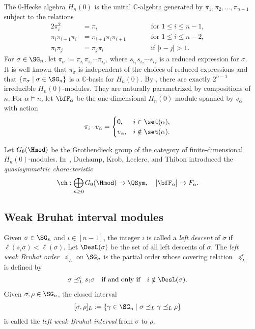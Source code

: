 \documentclass[12pt, reqno]{amsart}
\numberwithin{equation}{section}
\numberwithin{figure}{section}
\numberwithin{table}{section}
\theoremstyle{definition}
\def\C{\mathbb C}
\begin{document}
The $0$-Hecke algebra $H_n(0)$ is the unital $\C$-algebra generated by $\pi_1,\pi_2,\ldots,\pi_{n-1}$ subject to the relations
\begin{alignat}{2}\label{eq: relations of pi}
\pi_i^2 &= \pi_i 
&\qquad& \text{for } 1\le i \le n-1, \nonumber \\ 
\pi_i\pi_{i+1}\pi_i &= \pi_{i+1}\pi_i\pi_{i+1}
&\qquad& \text{for } 1\le i \le n-2, \\ \nonumber
\pi_i\pi_j &= \pi_j\pi_i
&\qquad& \text{if } |i-j|>1.
\end{alignat}
For $\sigma \in \SG_n$, let $\pi_\sigma:=\pi_{i_1}\pi_{i_2}\cdots\pi_{i_k}$, where $s_{i_1}s_{i_2}\cdots s_{i_k}$ is a reduced expression for $\sigma$.
It is well known that $\pi_\sigma$ is independent of the choices of reduced expressions and that $\{\pi_\sigma \mid \sigma \in \SG_n\}$ is a $\C$-basis for $H_n(0)$.
By \cite{Norton79}, there are exactly $2^{n-1}$ irreducible $H_n(0)$-modules. They are naturally parametrized by compositions of $n$.
For $\alpha\models n$, let $\bfF_\alpha$ be the one-dimensional $H_n(0)$-module spanned by $v_\alpha$ with action
\[
\pi_i\cdot v_\alpha=
\begin{cases}
0, & i\in \set(\alpha),\\
v_\alpha, & i\notin \set(\alpha).
\end{cases}
\]

Let $G_0(\Hmod)$ be the Grothendieck group of the category of finite-dimensional $H_n(0)$-modules. In~\cite{DKLT96}, Duchamp, Krob, Leclerc, and Thibon introduced the \emph{quasisymmetric characteristic}
\[
\ch:\bigoplus_{n\ge 0}G_0(\Hmod) \rightarrow \QSym,
\quad
[\bfF_\alpha]\mapsto F_\alpha.
\]




\subsection{Weak Bruhat interval modules}
\label{subsec: weak bruhat prelim}


Given $\sigma \in \SG_n$ and $i \in [n-1]$, the integer $i$ is called a \emph{left descent} of $\sigma$ if $\ell(s_i\sigma)<\ell(\sigma)$.
Let $\DesL(\sigma)$ be the set of all left descents of $\sigma$.
The \emph{left weak Bruhat order} $\preceq_L$ on $\SG_n$ is the partial order whose covering relation $\preceq_L^c$ is defined by
\[
\sigma \preceq_L^c s_i\sigma
\quad\text{if and only if}\quad
i \notin \DesL(\sigma).
\]
Given $\sigma,\rho \in \SG_n$, the closed interval
\[
[\sigma,\rho]_L:=\{\gamma \in \SG_n\mid \sigma \preceq_L \gamma \preceq_L \rho\}
\]
is called the \emph{left weak Bruhat interval} from $\sigma$ to $\rho$.
\end{document}
